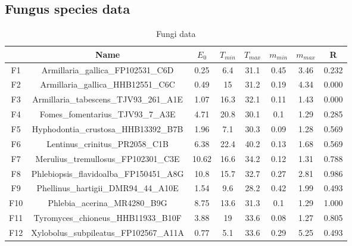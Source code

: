 \documentclass[a4paper,12pt]{article}
\begin{document}
\begin{appendix}


\section{Fungus species data}

\begin{table}[H]
                \centering
                \caption{Fungi data}
                \begin{tabular}{|c|c|c|c|c|c|c|c|}
                \hline
                    & Name                                    & $E_0$ & $T_{min}$ & $T_{max}$ & $m_{min}$ & $m_{max}$ & R     \\ \hline
                F1  & Armillaria\_gallica\_FP102531\_C6D      & 0.25  & 6.4       & 31.1      & 0.45      & 3.46      & 0.232 \\ \hline
                F2  & Armillaria\_gallica\_HHB12551\_C6C      & 0.49  & 15        & 31.2      & 0.19      & 4.34      & 0.000 \\ \hline
                F3  & Armillaria\_tabescens\_TJV93\_261\_A1E  & 1.07  & 16.3      & 32.1      & 0.11      & 1.43      & 0.000 \\ \hline
                F4  & Fomes\_fomentarius\_TJV93\_7\_A3E       & 4.71  & 20.8      & 30.1      & 0.1       & 1.29      & 0.285 \\ \hline
                F5  & Hyphodontia\_crustosa\_HHB13392\_B7B    & 1.96  & 7.1       & 30.3      & 0.09      & 1.28      & 0.569 \\ \hline
                F6  & Lentinus\_crinitus\_PR2058\_C1B         & 6.38  & 22.4      & 40.2      & 0.13      & 1.68      & 0.569 \\ \hline
                F7  & Merulius\_tremullosus\_FP102301\_C3E    & 10.62 & 16.6      & 34.2      & 0.12      & 1.31      & 0.788 \\ \hline
                F8  & Phlebiopsis\_flavidoalba\_FP150451\_A8G & 10.8  & 15.7      & 32.7      & 0.27      & 2.81      & 0.986 \\ \hline
                F9  & Phellinus\_hartigii\_DMR94\_44\_A10E    & 1.54  & 9.6       & 28.2      & 0.42      & 1.99      & 0.493 \\ \hline
                F10 & Phlebia\_acerina\_MR4280\_B9G           & 8.75  & 13.6      & 31.3      & 0.1       & 1.29      & 1.000 \\ \hline
                F11 & Tyromyces\_chioneus\_HHB11933\_B10F     & 3.88  & 19        & 33.6      & 0.08      & 1.27      & 0.805 \\ \hline
                F12 & Xylobolus\_subpileatus\_FP102567\_A11A  & 0.77  & 5.1       & 33.6      & 0.29      & 5.25      & 0.493 \\ \hline
                \end{tabular}
                \end{table}
                
\end{appendix}


\newpage 
\begin{figure}[H]
        
\end{figure}
\newpage 
\begin{figure}[H]
    
\end{figure}
\end{document}
